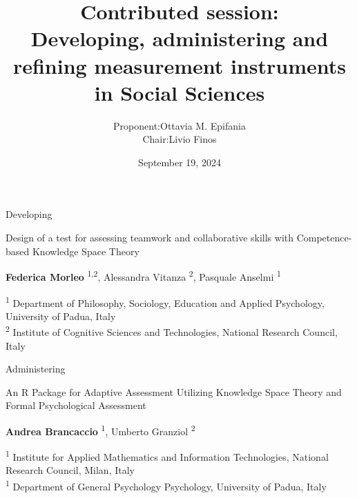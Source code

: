 \documentclass{beamer}
\title{Contributed session: \\ Developing, administering and refining measurement instruments in Social Sciences}
\author{\begin{tabular}{rl}
		 Proponent:&  Ottavia M. Epifania \\ 
		 Chair: & Livio Finos \\
	\end{tabular}}
\date{September 19, 2024}
\begin{document}
\begin{frame}[plain]
    \maketitle
\end{frame}
\begin{frame}{Developing}
	\begin{center}
		\begin{Large}
					Design of a test for assessing teamwork and collaborative skills with Competence-based Knowledge Space Theory
		\end{Large}

		
		\vspace{5mm}
		\textbf{Federica Morleo }\textsuperscript{1,2}, Alessandra Vitanza \textsuperscript{2}, Pasquale Anselmi \textsuperscript{1}
		
		\small
		\vspace{3mm}
		\textsuperscript{1}	Department of Philosophy, Sociology, Education and Applied Psychology, University of Padua, Italy \\
		\textsuperscript{2}	Institute of Cognitive Sciences and Technologies, National Research Council, Italy
		
	\end{center}

\end{frame}

\begin{frame}{Administering}
	\begin{center}
		\begin{Large}
	An R Package for Adaptive Assessment Utilizing Knowledge Space Theory and Formal Psychological Assessment
		\end{Large}
		
		
		\vspace{5mm}
\textbf{Andrea Brancaccio} \textsuperscript{1}, Umberto Granziol \textsuperscript{2}

		\small
		\vspace{3mm}
		\textsuperscript{1} Institute for Applied Mathematics and Information Technologies, National Research Council, Milan, Italy \\
		\textsuperscript{1}	Department of General Psychology Psychology, University of Padua, Italy
		
	\end{center}
\end{frame}
\end{document}
